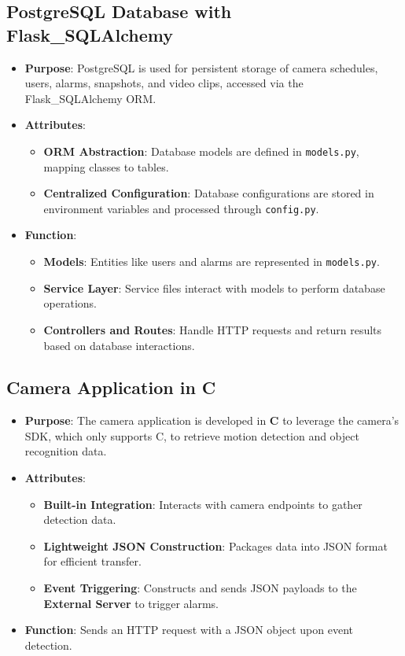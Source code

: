 \documentclass{article}
\begin{document}
\subsection{PostgreSQL Database with Flask\_SQLAlchemy}
\begin{itemize}
    \item \textbf{Purpose}: PostgreSQL is used for persistent storage of camera schedules, users, alarms, snapshots, and video clips, accessed via the Flask\_SQLAlchemy ORM.
    \item \textbf{Attributes}:
    \begin{itemize}
        \item \textbf{ORM Abstraction}: Database models are defined in \texttt{models.py}, mapping classes to tables.
        \item \textbf{Centralized Configuration}: Database configurations are stored in environment variables and processed through \texttt{config.py}.
    \end{itemize}
    \item \textbf{Function}:
    \begin{itemize}
        \item \textbf{Models}: Entities like users and alarms are represented in \texttt{models.py}.
        \item \textbf{Service Layer}: Service files interact with models to perform database operations.
        \item \textbf{Controllers and Routes}: Handle HTTP requests and return results based on database interactions.
    \end{itemize}
\end{itemize}

\subsection{Camera Application in C}
\begin{itemize}
    \item \textbf{Purpose}: The camera application is developed in \textbf{C} to leverage the camera’s SDK, which only supports C, to retrieve motion detection and object recognition data.
    \item \textbf{Attributes}:
    \begin{itemize}
        \item \textbf{Built-in Integration}: Interacts with camera endpoints to gather detection data.
        \item \textbf{Lightweight JSON Construction}: Packages data into JSON format for efficient transfer.
        \item \textbf{Event Triggering}: Constructs and sends JSON payloads to the \textbf{External Server} to trigger alarms.
    \end{itemize}
    \item \textbf{Function}: Sends an HTTP request with a JSON object upon event detection.
\end{itemize}
\end{document}
